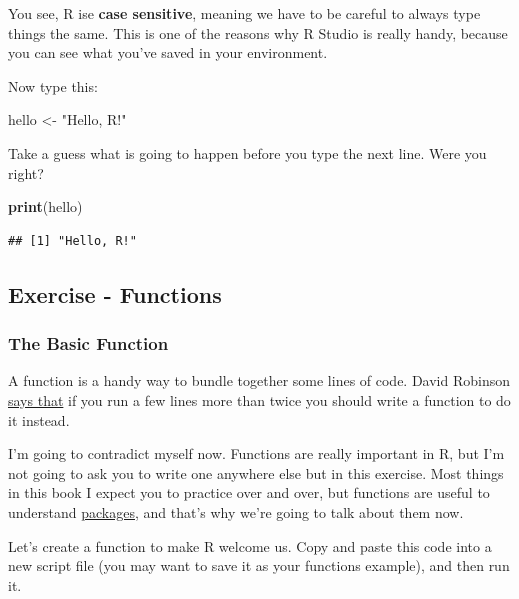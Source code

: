 \documentclass[
]{book}
\newenvironment{Shaded}{\begin{snugshade}}{\end{snugshade}}
\newcommand{\KeywordTok}[1]{\textcolor[rgb]{0.13,0.29,0.53}{\textbf{#1}}}
\newcommand{\NormalTok}[1]{#1}
\newcommand{\StringTok}[1]{\textcolor[rgb]{0.31,0.60,0.02}{#1}}
\begin{document}
You see, R ise \textbf{case sensitive}, meaning we have to be careful to always type things the same. This is one of the reasons why R Studio is really handy, because you can see what you've saved in your environment.

Now type this:

\begin{Shaded}
\begin{Highlighting}[]
\NormalTok{hello <-}\StringTok{ "Hello, R!"}
\end{Highlighting}
\end{Shaded}

Take a guess what is going to happen before you type the next line. Were you right?

\begin{Shaded}
\begin{Highlighting}[]
\KeywordTok{print}\NormalTok{(hello)}
\end{Highlighting}
\end{Shaded}

\begin{verbatim}
## [1] "Hello, R!"
\end{verbatim}

\hypertarget{ex_func}{%
\subsection{Exercise - Functions}\label{ex_func}}

\hypertarget{the-basic-function}{%
\subsubsection{The Basic Function}\label{the-basic-function}}

A function is a handy way to bundle together some lines of code. David Robinson \href{https://twitter.com/drob/status/928447584712253440?s=20}{says that} if you run a few lines more than twice you should write a function to do it instead.

I'm going to contradict myself now. Functions are really important in R, but I'm not going to ask you to write one anywhere else but in this exercise. Most things in this book I expect you to practice over and over, but functions are useful to understand \protect\hyperlink{packages}{packages}, and that's why we're going to talk about them now.

Let's create a function to make R welcome us. Copy and paste this code into a new script file (you may want to save it as your functions example), and then run it.
\end{document}

